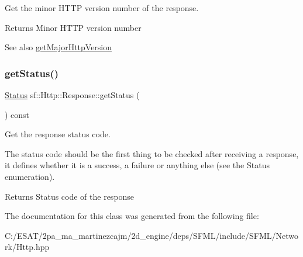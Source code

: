 Get the minor H\+T\+TP version number of the response. 

\begin{DoxyReturn}{Returns}
Minor H\+T\+TP version number
\end{DoxyReturn}
\begin{DoxySeeAlso}{See also}
\hyperlink{classsf_1_1_http_1_1_response_ab1c6948f6444fad34d0537e206e398b8}{get\+Major\+Http\+Version} 
\end{DoxySeeAlso}
\mbox{\label{classsf_1_1_http_1_1_response_a4271651703764fd9a7d2c0315aff20de}} 
\subsubsection{\texorpdfstring{get\+Status()}{getStatus()}}
{\footnotesize\ttfamily \hyperlink{classsf_1_1_http_1_1_response_a663e071978e30fbbeb20ed045be874d8}{Status} sf\+::\+Http\+::\+Response\+::get\+Status (\begin{DoxyParamCaption}{ }\end{DoxyParamCaption}) const}



Get the response status code. 

The status code should be the first thing to be checked after receiving a response, it defines whether it is a success, a failure or anything else (see the Status enumeration).

\begin{DoxyReturn}{Returns}
Status code of the response 
\end{DoxyReturn}


The documentation for this class was generated from the following file\+:\begin{DoxyCompactItemize}
\item 
C\+:/\+E\+S\+A\+T/2pa\+\_\+ma\+\_\+martinezcajm/2d\+\_\+engine/deps/\+S\+F\+M\+L/include/\+S\+F\+M\+L/\+Network/Http.\+hpp\end{DoxyCompactItemize}
